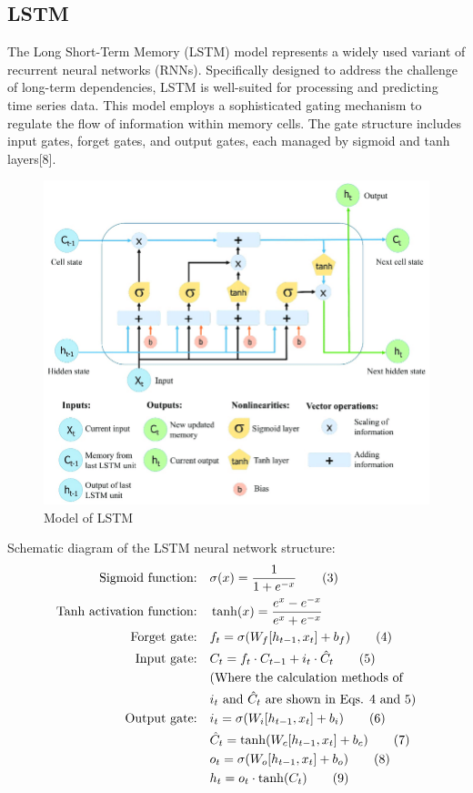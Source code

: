 \documentclass{ieeeojies}
\begin{document}
\subsection{LSTM}
The Long Short-Term Memory (LSTM) model represents a widely used variant of recurrent neural networks (RNNs). Specifically designed to address the challenge of long-term dependencies, LSTM is well-suited for processing and predicting time series data. This model employs a sophisticated gating mechanism to regulate the flow of information within memory cells. The gate structure includes input gates, forget gates, and output gates, each managed by sigmoid and tanh layers[8].
\begin{figure}[H]
  \centering
  \begin{minipage}{0.8\linewidth}
    \centering
    \includegraphics[width=\linewidth]{bibliography/lstm_fig.png}
    \caption{Model of LSTM}
    \label{fig8}
  \end{minipage}
\end{figure}
Schematic diagram of the LSTM neural network structure:
\begin{align}
\text{Sigmoid function:} & \quad \sigma(x) = \frac{1}{1 + e^{-x}} \tag{3} \\
\text{Tanh activation function:} & \quad \tanh(x) = \frac{e^x - e^{-x}}{e^x + e^{-x}} \notag \\
\text{Forget gate:} & \quad f_t = \sigma(W_f [h_{t-1}, x_t] + b_f) \tag{4} \\
\text{Input gate:} & \quad C_t = f_t \cdot C_{t-1} + i_t \cdot \hat{C}_t \tag{5} \\
& \quad \text{(Where the calculation methods of }\notag \\
& \quad i_t \text{ and } \hat{C}_t \text{ are shown in Eqs. 4 and 5)} \notag \\
\text{Output gate:} & \quad i_t = \sigma(W_i [h_{t-1}, x_t] + b_i) \tag{6} \\
& \quad \hat{C}_t = \tanh(W_c [h_{t-1}, x_t] + b_c) \tag{7} \\
& \quad o_t = \sigma(W_o [h_{t-1}, x_t] + b_o) \tag{8} \\
& \quad h_t = o_t \cdot \tanh(C_t) \tag{9}
\end{align}
\end{document}

